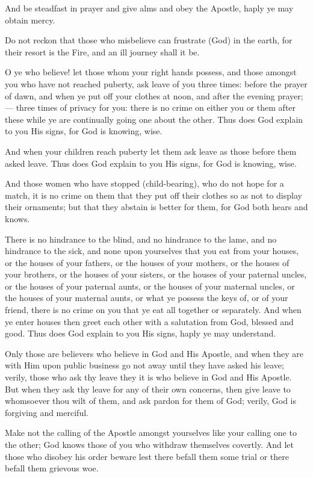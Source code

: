 \documentclass[fontsize=14pt, letterpaper, notitlepage, openany, DIV=12]{scrbook} %
\begin{document}
\noindent[24:56]
And be steadfast in prayer and give alms and obey the Apostle, haply ye may obtain
mercy.

\noindent[24:57]
Do not reckon that those who misbelieve can frustrate (God) in the earth, for their resort
is the Fire, and an ill journey shall it be.

\noindent[24:58]
O ye who believe! let those whom your right hands possess, and those amongst you who
have not reached puberty, ask leave of you three times: before the prayer of dawn, and when ye
put off your clothes at noon, and after the evening prayer;--- three times of privacy for you: there
is no crime on either you or them after these while ye are continually going one about the other.
Thus does God explain to you His signs, for God is knowing, wise.

\noindent[24:59]
And when your children reach puberty let them ask leave as those before them asked
leave. Thus does God explain to you His signs, for God is knowing, wise.

\noindent[24:60]
And those women who have stopped (child-bearing), who do not hope for a match, it is
no crime on them that they put off their clothes so as not to display their ornaments; but that they
abstain is better for them, for God both hears and knows.

\noindent[24:61]
There is no hindrance to the blind, and no hindrance to the lame, and no hindrance to the
sick, and none upon yourselves that you eat from your houses, or the houses of your fathers, or
the houses of your mothers, or the houses of your brothers, or the houses of your sisters, or the
houses of your paternal uncles, or the houses of your paternal aunts, or the houses of your
maternal uncles, or the houses of your maternal aunts, or what ye possess the keys of, or of your
friend, there is no crime on you that ye eat all together or separately. And when ye enter houses
then greet each other with a salutation from God, blessed and good. Thus does God explain to
you His signs, haply ye may understand.

\noindent[24:62]
Only those are believers who believe in God and His Apostle, and when they are with
Him upon public business go not away until they have asked his leave; verily, those who ask thy
leave they it is who believe in God and His Apostle. But when they ask thy leave for any of their
own concerns, then give leave to whomsoever thou wilt of them, and ask pardon for them of
God; verily, God is forgiving and merciful.

\noindent[24:63]
Make not the calling of the Apostle amongst yourselves like your calling one to the other;
God knows those of you who withdraw themselves covertly. And let those who disobey his order
beware lest there befall them some trial or there befall them grievous woe.
\end{document}
